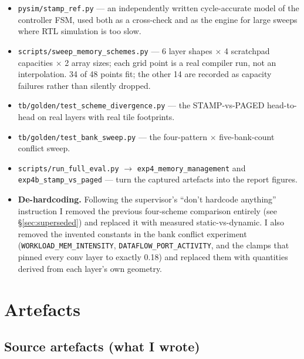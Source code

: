\documentclass[11pt,a4paper]{article}
\newcommand{\file}[1]{\texttt{\small #1}}
\begin{document}
\begin{itemize}[leftmargin=1.5em,itemsep=3pt]
  \item \file{pysim/stamp\_ref.py} --- an independently written cycle-accurate
        model of the controller FSM, used both as a cross-check and as the
        engine for large sweeps where RTL simulation is too slow.
  \item \file{scripts/sweep\_memory\_schemes.py} --- 6 layer shapes $\times$ 4
        scratchpad capacities $\times$ 2 array sizes; each grid point is a real
        compiler run, not an interpolation. 34 of 48 points fit; the other 14
        are recorded as capacity failures rather than silently dropped.
  \item \file{tb/golden/test\_scheme\_divergence.py} --- the STAMP-vs-PAGED
        head-to-head on real layers with real tile footprints.
  \item \file{tb/golden/test\_bank\_sweep.py} --- the four-pattern $\times$
        five-bank-count conflict sweep.
  \item \file{scripts/run\_full\_eval.py} $\to$ \file{exp4\_memory\_management}
        and \file{exp4b\_stamp\_vs\_paged} --- turn the captured artefacts into
        the report figures.
  \item \textbf{De-hardcoding.} Following the supervisor's ``don't hardcode
        anything'' instruction I removed the previous four-scheme comparison
        entirely (see \S\ref{sec:superseded}) and replaced it with measured
        static-vs-dynamic. I also removed the invented constants in the bank
        conflict experiment (\file{WORKLOAD\_MEM\_INTENSITY},
        \file{DATAFLOW\_PORT\_ACTIVITY}, and the clamps that pinned every conv
        layer to exactly 0.18) and replaced them with quantities derived from
        each layer's own geometry.
\end{itemize}

\section{Artefacts}

\subsection{Source artefacts (what I wrote)}
\end{document}
